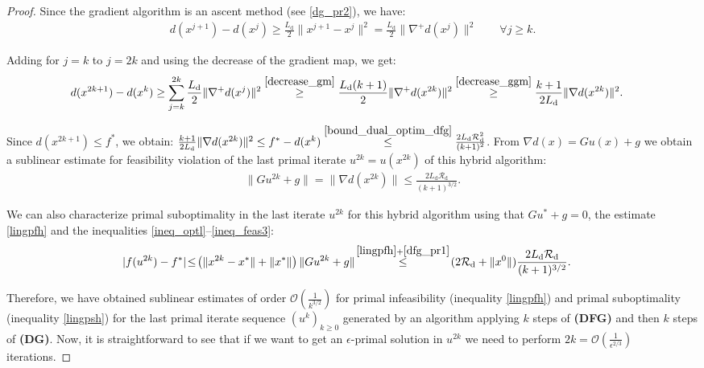 \documentclass{gOMS2e}
\theoremstyle{plain}
\theoremstyle{definition}
\theoremstyle{remark}
\begin{document}
\begin{proof}
Since  the gradient algorithm is an ascent method (see \eqref{dg_pr2}), we have:
\begin{align*}
d(x^{j+1}) - d(x^j)  \geq  \frac{L_\text{d}}{2}  \|x^{j+1} - x^j \|^2 =  \frac{L_\text{d}}{2} \|\nabla^+ d(x^j)\|^2   \qquad \forall j \geq k.
\end{align*}

\noindent  Adding for $j=k$ to $j=2k$ and using the decrease of the  gradient map,  we get:
\begin{align*}
 d(x^{2k+1})  -  d(x^{k})  & \geq  \sum_{j=k}^{2k}
\frac{L_\text{d}}{2} \|\nabla^+ d(x^j)\|^2
\overset{\eqref{decrease_gm}}{\geq}  \frac{L_\text{d}(k+1)}{2}
\|\nabla^+ d(x^{2k})\|^2   \overset{\eqref{decrease_ggm}}{\geq}
\frac{k+1}{2L_\text{d}} \|\nabla d(x^{2k})\|^2.
\end{align*}

\noindent Since $d(x^{2k+1}) \leq f^*$, we obtain:
$\frac{k+1}{2L_\text{d}}  \|\nabla d(x^{2k})\|^2  \leq f^* -
d(x^{k}) \overset{\eqref{bound_dual_optim_dfg}}{\leq} \frac{2
L_\text{d} \mathcal{R}_\text{d}^2}{(k+1)^2}$.   From $\nabla d(x) =
G u(x) + g$  we obtain a sublinear estimate for feasibility
violation of the last primal iterate  $u^{2k} = u(x^{2k})$ of this
hybrid algorithm:
\begin{align}
\label{lingpfh} \|G u^{2k} + g \| = \|\nabla d(x^{2k})\|   \leq
\frac{2 L_\text{d} \mathcal{R}_\text{d}}{(k+1)^{3/2}}.
\end{align}

\noindent We can also characterize primal suboptimality in the last
iterate $u^{2k} $ for  this hybrid algorithm  using that $G
u^* + g=0$, the  estimate   \eqref{lingpfh}  and the
inequalities \eqref{ineq_optl}--\eqref{ineq_feas3}:
\begin{align}
\label{lingpsh} |f(u^{2k}) - f^*| & \!\leq\!   \left( \|x^{2k} -
x^*\| + \|x^*\|\right ) \|G u^{2k} + g \| \!\overset{\eqref{lingpfh}
+ \eqref{dfg_pr1}}{\leq}\! (2\mathcal{R}_\text{d} + \|x^0\|) \frac{2
L_\text{d} \mathcal{R}_\text{d}}{(k+1)^{3/2}}.
\end{align}

\noindent Therefore, we have obtained sublinear estimates  of order
$\mathcal{O}(\frac{1}{k^{3/2}})$ for primal infeasibility
(inequality \eqref{lingpfh}) and primal suboptimality (inequality
\eqref{lingpsh}) for the last primal iterate sequence $(u^k)_{k \geq
0}$ generated by an algorithm applying $k$ steps  of \textbf{(DFG)}
and then $k$ steps  of \textbf{(DG)}. Now, it is straightforward to
see that if we want to get an $\epsilon$-primal solution in $u^{2k}$
we need to perform $2k = {\mathcal O} (\frac{1}{\epsilon^{2/3}})$
iterations.
\end{proof}
\end{document}
